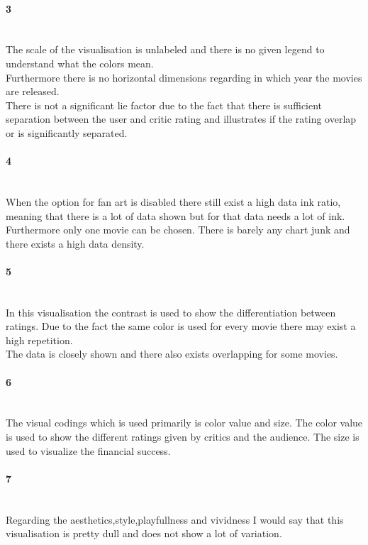 \paragraph{3}\mbox{}\\
The scale of the visualisation is unlabeled and there is no given legend to understand what the colors mean.\\ Furthermore there is no horizontal dimensions regarding in which year the movies are released.\\
There is not a significant lie factor due to the fact that there is sufficient separation between the user and critic rating and illustrates if the rating overlap or is significantly separated.

\paragraph{4}\mbox{}\\
When the option for fan art is disabled there still exist a high data ink ratio, meaning that there is a lot of data shown but for that data needs a lot of ink. Furthermore only one movie can be chosen. There is barely any chart junk and there exists a high data density.

\paragraph{5}\mbox{}\\
In this visualisation the contrast is used to show the differentiation between ratings. Due to the fact the same color is used for every movie there may exist a high repetition.\\
The data is closely shown and there also exists overlapping for some movies.

\paragraph{6}\mbox{}\\
The visual codings which is used primarily is color value and size. The color value is used to show the different ratings given by critics and the audience. The size is used to visualize the financial success. 

\paragraph{7}\mbox{}\\
Regarding the aesthetics,style,playfullness and vividness I would say that this visualisation is pretty dull and does not show a lot of variation.

